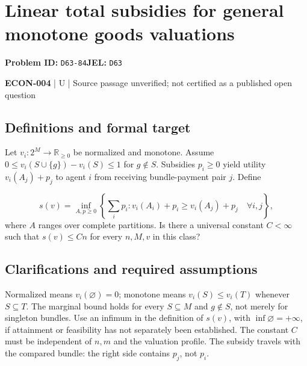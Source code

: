 \documentclass[11pt,a4paper]{article}
\begin{document}
\section*{Linear total subsidies for general monotone goods valuations}
\textbf{Problem ID:} \texttt{D63-84}\quad \textbf{JEL:} \texttt{D63}\par
\label{problem:OP-0591}


\label{audited:ECON-004}

{\sffamily\small\color{muted}\textbf{ECON-004} | U | Source passage unverified; not certified as a published open question\par}

\subsection*{Definitions and formal target}

Let $v_i:2^M\to\mathbb R_{\geq0}$ be normalized and monotone. Assume $0\leq v_i(S\cup\{g\})-v_i(S)\leq1$ for $g\notin S$. Subsidies $p_i\geq0$ yield utility $v_i(A_j)+p_j$ to agent $i$ from receiving bundle-payment pair $j$. Define

\[
 s(v)=\inf_{A,p\geq0}\left\{\sum_i p_i:
 v_i(A_i)+p_i\geq v_i(A_j)+p_j\quad\forall i,j\right\},
\]
where $A$ ranges over complete partitions. Is there a universal constant $C<\infty$ such that $s(v)\leq Cn$ for every $n,M,v$ in this class?

\subsection*{Clarifications and required assumptions}

Normalized means $v_i(\varnothing)=0$; monotone means $v_i(S)\leq v_i(T)$ whenever $S\subseteq T$. The marginal bound holds for every $S\subseteq M$ and $g\notin S$, not merely for singleton bundles. Use an infimum in the definition of $s(v)$, with $\inf\varnothing=+\infty$, if attainment or feasibility has not separately been established. The constant $C$ must be independent of $n,m$ and the valuation profile. The subsidy travels with the compared bundle: the right side contains $p_j$, not $p_i$.
\end{document}
